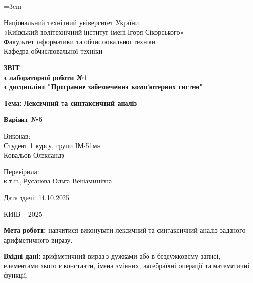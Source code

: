 \documentclass[14pt, a4paper]{extreport}
\newcommand{\CourseTitle}{Програмне забезпечення комп'ютерних систем}
\newcommand{\Variant}{5}
\newcommand{\StudentGroup}{ІМ-51мн}
\newcommand{\CourseNumber}{1}
\newcommand{\StudentName}{Ковальов Олександр}
\newcommand{\Teacher}{к.т.н., Русанова Ольга Веніаминівна}
\newcommand{\Year}{2025}
\newcommand{\LabNumber}{1}
\newcommand{\Topic}{Лексичний та синтаксичний аналіз}
\newcommand{\SubmissionDate}{14.10.2025}
\begin{document}
	\emergencystretch=3em
	
	\begin{titlepage}
		\begin{center}
			{Національний технічний університет України\\
				«Київський політехнічний інститут імені Ігоря Сікорського» \\[1.0em] }
			{Факультет інформатики та обчислювальної техніки\\}
			{Кафедра обчислювальної техніки \\[5.0em]}
			
			{\textbf{ЗВІТ}\\[1em]}
			{\textbf{з лабораторної роботи №\LabNumber} \\}
			{\textbf{з дисципліни "\CourseTitle"} \\[2.0em]}
			
			{\textbf{Тема: \Topic} \\[2.0em]}
			
			{\textbf{Варіант №\Variant} \\[5.0em]}
			
			\begin{flushright}
				Виконав: \\
				Студент \CourseNumber{} курсу, групи \StudentGroup \\
				\StudentName \\[2.0em]
			\end{flushright}
			
			\begin{flushright}
				Перевірила: \\
				\Teacher \\[2.0em]
			\end{flushright}
			
			\begin{flushright}
				Дата здачі: \SubmissionDate \\[5.0em]
			\end{flushright}
		
			\vfill
			КИЇВ -- \Year
		\end{center}
	\end{titlepage}
	
	\setlength{\parindent}{1.25cm}
	
	\textbf{Мета роботи:} навчитися виконувати лексичний та синтаксичний аналіз заданого арифметичного виразу.
	
	\textbf{Вхідні дані:} арифметичний вираз з дужками або в бездужковому записі, елементами якого є константи, імена змінних, алгебраїчні операції та математичні функції.
	
\end{document}
